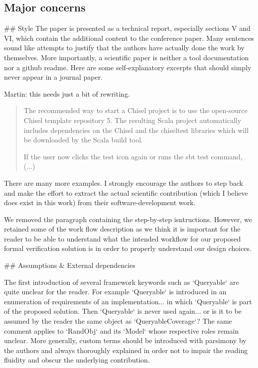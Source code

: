 \documentclass{article}
\newcommand{\martin}[1]{{\color{blue} Martin: #1\\}}
\newcommand{\reply}[1]{{\color{blue} #1}}
\begin{document}
\subsection*{Major concerns}
\#\# Style
The paper is presented as a technical report, especially sections V and VI, which contain the additional content to the conference paper.
Many sentences sound like attempts to justify that the authors have actually done the work by themselves. 
More importantly, a scientific paper is neither a tool documentation nor a github readme.
Here are some self-explanatory excerpts that should simply never appear in a journal paper.

\martin{this needs just a bit of rewriting.}

\begin{quote}
The recommended way to
start a Chisel project is to use the open-source Chisel template
repository 5. The resulting Scala project automatically includes
dependencies on the Chisel and the chiseltest libraries which
will be downloaded by the Scala build tool.

If the user now clicks the test icon again
or runs the sbt test command, (...)
\end{quote}


There are many more examples. 
I strongly encourage the authors to step back and make the effort to extract the actual scientific contribution (which I believe does exist in this work) from their software-development work.

\reply{
We removed the paragraph containing the step-by-step isntructions. However, we retained some of the work flow description as we think it is important for the reader to be able to understand what
the intended workflow for our proposed formal verification solution is in order to properly understand our design choices.
}


\#\# Assumptions \& External dependencies

The first introduction of several framework keywords such as `Queryable` are quite unclear for the reader.
For example `Queryable` is introduced in an enumeration of requirements of an implementation... in which `Queryable` is part of the proposed solution.
Then `Queryable` is never used again... or is it to be assumed by the reader the same object as `QueryableCoverage`?
The same comment applies to `RandObj` and its `Model` whose respective roles remain unclear.
More generally, custom terms should be introduced with parsimony by the authors and always thoroughly explained in order not to impair the reading fluidity and obscur the underlying contribution.
\end{document}
